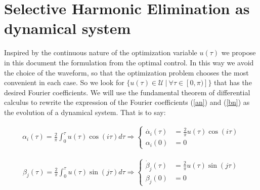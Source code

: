 
\section{Selective Harmonic Elimination as dynamical system}

%


Inspired by the continuous nature of the optimization variable $ u (\tau) $ we propose in this document the formulation from the optimal control. In this way we avoid the choice of the waveform, so that the optimization problem chooses the most convenient in each case. So we look for $ \{u (\tau) \in \mathcal{U} \ | \ \forall \tau \in [0, \pi)] \} $ that has the desired Fourier coefficients.
%
We will use the fundamental theorem of differential calculus to rewrite the expression of the Fourier coefficients (\ref {an}) and (\ref {bn}) as the evolution of a dynamical system. That is to say:

\begin{gather}
    \alpha_i(\tau) = \frac{2}{\pi}\int_0^\tau u(\tau) \cos(i\tau)d\tau 
    \Rightarrow
    \begin{cases} \label{ode}
        \dot{\alpha_i}(\tau) & = \frac{2}{\pi}u(\tau)\cos(i\tau) \\  
        \alpha_i(0) & = 0       
    \end{cases}
\end{gather}

\begin{gather}
    \beta_j(\tau) = \frac{2}{\pi}\int_0^\tau u(\tau) \sin(j\tau)d\tau 
    \Rightarrow
    \begin{cases} \label{ode}
        \dot{\beta}_j(\tau) & = \frac{2}{\pi}u(\tau)\sin(j\tau) \\  
        \beta_j(0) & = 0       
    \end{cases}
\end{gather}

